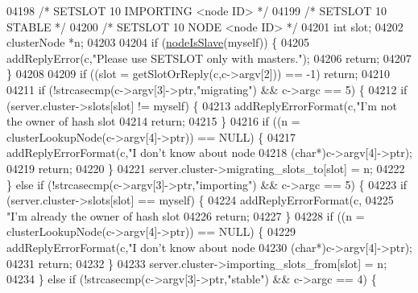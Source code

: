 \begin{DoxyCode}
{{{{{{{{{{{{{{{{{{{{{{{{{{{{{{{{{{{{{{{{{{{{{{{{{{{{{{{{{{{{{{{{{{{{{{{{{{{{{04198         \textcolor{comment}{/* SETSLOT 10 IMPORTING <node ID> */}
04199         \textcolor{comment}{/* SETSLOT 10 STABLE */}
04200         \textcolor{comment}{/* SETSLOT 10 NODE <node ID> */}
04201         \textcolor{keywordtype}{int} slot;
04202         clusterNode *n;
04203 
04204         \textcolor{keywordflow}{if} (\hyperlink{cluster_8h_a3c99881f6892130c902b42b1f84a0e11}{nodeIsSlave}(myself)) \{
04205             addReplyError(c,\textcolor{stringliteral}{"Please use SETSLOT only with masters."});
04206             \textcolor{keywordflow}{return};
04207         \}
04208 
04209         \textcolor{keywordflow}{if} ((slot = getSlotOrReply(c,c->argv[2])) == -1) \textcolor{keywordflow}{return};
04210 
04211         \textcolor{keywordflow}{if} (!strcasecmp(c->argv[3]->ptr,\textcolor{stringliteral}{"migrating"}) && c->argc == 5) \{
04212             \textcolor{keywordflow}{if} (server.cluster->slots[slot] != myself) \{
04213                 addReplyErrorFormat(c,\textcolor{stringliteral}{"I'm not the owner of hash slot %
04214                 \textcolor{keywordflow}{return};
04215             \}
04216             \textcolor{keywordflow}{if} ((n = clusterLookupNode(c->argv[4]->ptr)) == NULL) \{
04217                 addReplyErrorFormat(c,\textcolor{stringliteral}{"I don't know about node %
04218                     (\textcolor{keywordtype}{char}*)c->argv[4]->ptr);
04219                 \textcolor{keywordflow}{return};
04220             \}
04221             server.cluster->migrating\_slots\_to[slot] = n;
04222         \} \textcolor{keywordflow}{else} \textcolor{keywordflow}{if} (!strcasecmp(c->argv[3]->ptr,\textcolor{stringliteral}{"importing"}) && c->argc == 5) \{
04223             \textcolor{keywordflow}{if} (server.cluster->slots[slot] == myself) \{
04224                 addReplyErrorFormat(c,
04225                     \textcolor{stringliteral}{"I'm already the owner of hash slot %
04226                 \textcolor{keywordflow}{return};
04227             \}
04228             \textcolor{keywordflow}{if} ((n = clusterLookupNode(c->argv[4]->ptr)) == NULL) \{
04229                 addReplyErrorFormat(c,\textcolor{stringliteral}{"I don't know about node %
04230                     (\textcolor{keywordtype}{char}*)c->argv[4]->ptr);
04231                 \textcolor{keywordflow}{return};
04232             \}
04233             server.cluster->importing\_slots\_from[slot] = n;
04234         \} \textcolor{keywordflow}{else} \textcolor{keywordflow}{if} (!strcasecmp(c->argv[3]->ptr,\textcolor{stringliteral}{"stable"}) && c->argc == 4) \{
}}}}}}}}}}}}}}}}}}}}}}}}}}}}}}}}}}}}}}}}}}}}}}}}}}}}}}}}}}}}}}}}}}}}}}}}}}}}}}}}}
\end{DoxyCode}
